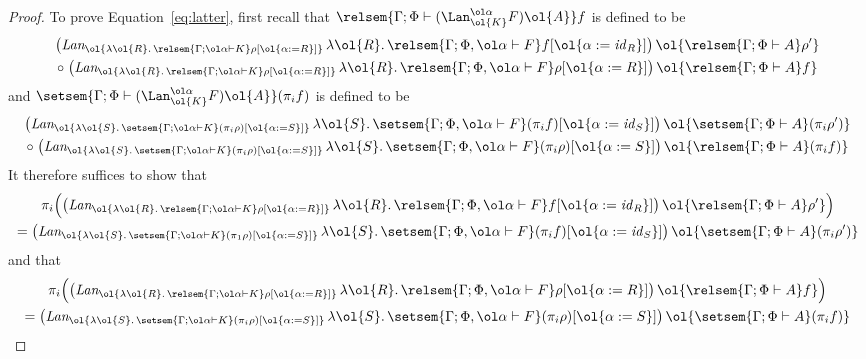 \documentclass{lmcs}
\theoremstyle{plain}\newtheorem{satz}[thm]{Satz}
\renewcommand{\id}{\mathit{id}}
\begin{document}
\begin{proof}
To prove Equation~\ref{eq:latter}, first recall that
$\relsem{ \Gamma; \Phi \vdash (\Lan^{\ol \alpha}_{\ol{K}} F)\ol{A} }
f$ is defined to be
\begin{multline*}
\big(\textit{Lan}_{\ol{\lambda \ol{R}.\,\relsem{\Gamma; \ol\alpha
      \vdash K}\rho[\ol{\alpha := R}]}}\, \lambda
\ol{R}.\,\relsem{\Gamma; \Phi, \ol\alpha \vdash F}f[\ol{\alpha :=
    \id_R}]\big)\, \ol{\relsem{\Gamma; \Phi \vdash A}\rho'} \\ \circ\;
\big(\textit{Lan}_{\ol{\lambda \ol{R}.\,\relsem{\Gamma; \ol\alpha
      \vdash K}\rho[\ol{\alpha := R}]}}\, \lambda
\ol{R}.\,\relsem{\Gamma; \Phi, \ol\alpha \vdash F}\rho[\ol{\alpha :=
    R}]\big)\, \ol{\relsem{\Gamma; \Phi \vdash A}f}
\end{multline*}
and $\setsem{\Gamma; \Phi \vdash (\Lan^{\ol \alpha}_{\ol{K}} F)\ol{A}
} (\pi_i f)$ is defined to be
\begin{multline*}
\big(\textit{Lan}_{\ol{\lambda \ol{S}.\,\setsem{\Gamma; \ol\alpha
      \vdash K}(\pi_i \rho)[\ol{\alpha := S}]}}\, \lambda
\ol{S}.\,\setsem{\Gamma; \Phi, \ol\alpha \vdash F}(\pi_i f)[\ol{\alpha
    := \id_S}]\big)\, \ol{\setsem{\Gamma; \Phi \vdash A}(\pi_i
  \rho')}\\ \circ\; \big(\textit{Lan}_{\ol{\lambda
    \ol{S}.\,\setsem{\Gamma; \ol\alpha \vdash K}(\pi_i
    \rho)[\ol{\alpha := S}]}}\, \lambda \ol{S}.\,\setsem{\Gamma; \Phi,
  \ol\alpha \vdash F}(\pi_i \rho)[\ol{\alpha := S}]\big)\,
\ol{\relsem{\Gamma; \Phi \vdash A}(\pi_i f)}
\end{multline*}
It therefore suffices to show that
\begin{multline}\label{eq:part-one}
\pi_i \Big( \big(\textit{Lan}_{\ol{\lambda \ol{R}.\,\relsem{\Gamma; \ol\alpha
      \vdash K}\rho[\ol{\alpha := R}]}}\,  
      \lambda \ol{R}.\,\relsem{\Gamma; \Phi, \ol\alpha \vdash F}f[\ol{\alpha := \id_R}]\big)\,
    \ol{\relsem{\Gamma; \Phi \vdash A}\rho'} \Big) \\
= \big(\textit{Lan}_{\ol{\lambda \ol{S}.\,\setsem{\Gamma; \ol\alpha
      \vdash K} (\pi_1 \rho) [\ol{\alpha := S}]}}\,  
      \lambda \ol{S}.\,\setsem{\Gamma; \Phi, \ol\alpha \vdash F}(\pi_i f)[\ol{\alpha := \id_S}]\big)\,
    \ol{\setsem{\Gamma; \Phi \vdash A}(\pi_i \rho')}
\end{multline}
and that
\begin{multline}\label{eq:part-two}
\pi_i \Big( \big(\textit{Lan}_{\ol{\lambda \ol{R}.\,\relsem{\Gamma; \ol\alpha
        \vdash K}\rho[\ol{\alpha := R}]}}\,  
      \lambda \ol{R}.\,\relsem{\Gamma; \Phi, \ol\alpha \vdash F}\rho[\ol{\alpha := R}]\big)\,
    \ol{\relsem{\Gamma; \Phi \vdash A}f} \Big) \\
= \big(\textit{Lan}_{\ol{\lambda \ol{S}.\,\setsem{\Gamma; \ol\alpha
        \vdash K} (\pi_i \rho) [\ol{\alpha := S}]}}\,  
      \lambda \ol{S}.\,\setsem{\Gamma; \Phi, \ol\alpha \vdash F} (\pi_i \rho) [\ol{\alpha := S}]\big)\,
    \ol{\setsem{\Gamma; \Phi \vdash A} (\pi_i f)}
\end{multline}


\end{proof}
\end{document}

